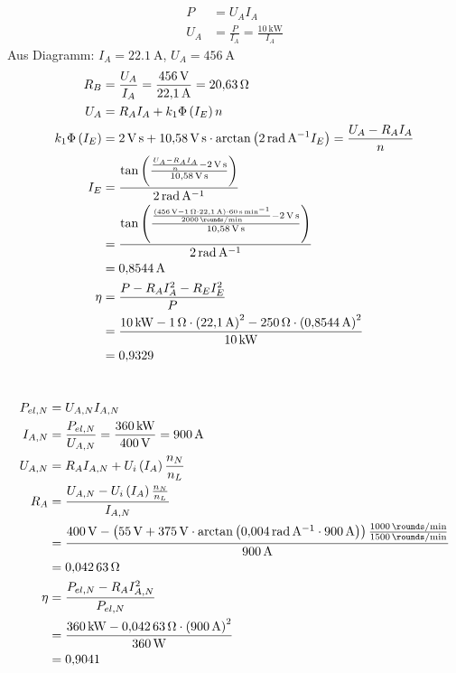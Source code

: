 \documentclass[11pt,a4paper]{scrartcl}
\newcommand{\mybr}[1]{\left(#1\right)}
\newcommand{\0}{_{\mybr{0}}}
\newcommand{\1}{_{\mybr{1}}}
\newcommand{\2}{_{\mybr{2}}}
\begin{document}
\subsection{}
\begin{align}
P&=U_A I_A\\
U_A&=\frac{P}{I_A}=\frac{\SI{10}{\kilo\watt}}{I_A}
\end{align}
Aus Diagramm: $I_A=\SI{22.1}{\ampere}$, $U_A=\SI{456}{\ampere}$
\begin{align}
R_B&=\frac{U_A}{I_A}=\frac{\SI{456}{\volt}}{\SI{22.1}{\ampere}}=\SI{20.63}{\ohm}\\
U_A&=R_A I_A+k_1\Phi\mybr{I_E}n\\
k_1\Phi\mybr{I_E}&=\SI{2}{\volt\second}+\SI{10.58}{\volt\second}\cdot\arctan\mybr{\SI{2}{\radian\per\ampere}I_E}=\frac{U_A-R_A I_A}{n}\\
I_E&=\frac{\tan\mybr{\frac{\frac{U_A-R_A I_A}{n}-\SI{2}{\volt\second}}{\SI{10.58}{\volt\second}}}}{\SI{2}{\radian\per\ampere}}\\
&=\frac{\tan\mybr{\frac{\frac{\mybr{\SI{456}{\volt}-\SI{1}{\ohm}\cdot\SI{22.1}{\ampere}}\cdot\SI{60}{\second\per\minute}}{\SI{2000}{\rounds\per\minute}}-\SI{2}{\volt\second}}{\SI{10.58}{\volt\second}}}}{\SI{2}{\radian\per\ampere}}\\
&=\SI{0.8544}{\ampere}\\
\eta&=\frac{P-R_A I_A^2-R_E I_E^2}{P}\\
&=\frac{\SI{10}{\kilo\watt}-\SI{1}{\ohm}\cdot\mybr{\SI{22.1}{\ampere}}^2-\SI{250}{\ohm}\cdot\mybr{\SI{0.8544}{\ampere}}^2}{\SI{10}{\kilo\watt}}\\
&=\num{0.9329}
\end{align}

\section{}
\subsection{}
\begin{align}
P_{el,N}&=U_{A,N}I_{A,N}\\
I_{A,N}&=\frac{P_{el,N}}{U_{A,N}}=\frac{\SI{360}{\kilo\watt}}{\SI{400}{\volt}}=\SI{900}{\ampere}\\
U_{A,N}&=R_A I_{A,N}+U_i\mybr{I_A}\frac{n_N}{n_L}\\
R_A&=\frac{U_{A,N}-U_i\mybr{I_A}\frac{n_N}{n_L}}{I_{A,N}}\\
&=\frac{\SI{400}{\volt}-\mybr{\SI{55}{\volt}+\SI{375}{\volt}\cdot\arctan\mybr{\SI{0.004}{\radian\per\ampere}\cdot\SI{900}{\ampere}}}\frac{\SI{1000}{\rounds\per\minute}}{\SI{1500}{\rounds\per\minute}}}{\SI{900}{\ampere}}\\
&=\SI{0.04263}{\ohm}\\
\eta&=\frac{P_{el,N}-R_A I_{A,N}^2}{P_{el,N}}\\
&=\frac{\SI{360}{\kilo\watt}-\SI{0.04263}{\ohm}\cdot\mybr{\SI{900}{\ampere}}^2}{\SI{360}{\watt}}\\
&=\num{0.9041}
\end{align}
\end{document}
